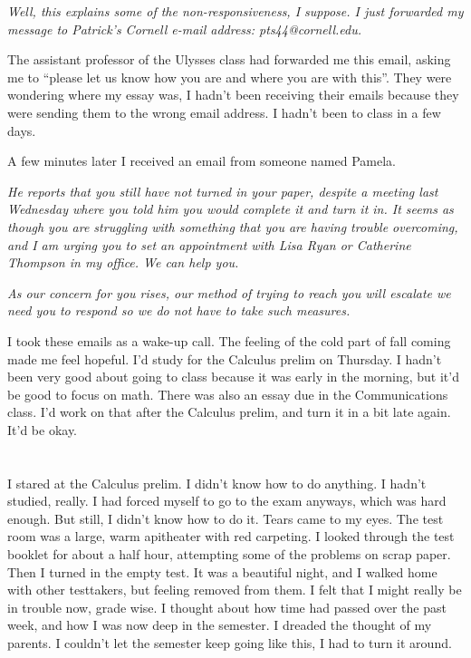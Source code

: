 \textit{Well, this explains some of the non-responsiveness, I suppose.  I just
forwarded my message to Patrick's Cornell e-mail address:  pts44@cornell.edu.}


The assistant professor of the Ulysses class had forwarded me this email, asking
me to ``please let us know how you are and where you are with this''.  They were
wondering where my essay was, I hadn't been receiving their emails because they
were sending them to the wrong email address.  I hadn't been to class in a few
days.

A few minutes later I received an email from someone named Pamela.

\textit{
He reports that you still have not turned in your paper, despite a meeting last
Wednesday where you told him you would complete it and turn it in.  It seems as
though you are struggling with something that you are having trouble
overcoming, and I am urging you to set an appointment with Lisa Ryan or
Catherine Thompson in my office.  We can help you. }

\textit{
As our concern for you rises, our method of trying to reach you will escalate 
we need you to respond so we do not have to take such measures.}



I took these emails as a wake-up call.  The feeling of the cold part of fall
coming made me feel hopeful.  I'd study for the Calculus prelim on Thursday.  I
hadn't been very good about going to class because it was early in the morning,
but it'd be good to focus on math.  There was also an essay due in the
Communications class.  I'd work on that after the Calculus prelim, and turn it
in a bit late again.  It'd be okay.

\section{}

I stared at the Calculus prelim.  I didn't know how to do anything.  I hadn't
studied, really. I had forced myself to go to the exam anyways, which was hard
enough.  But still, I didn't know how to do it.  Tears came to my eyes.  The
test room was a large, warm apitheater with red carpeting. I looked through the
test booklet for about a half hour, attempting some of the problems on scrap
paper.    Then I turned in the empty test.  It was a beautiful night, and I
walked home with other testtakers, but feeling removed from them.  I felt that I
might really be in trouble now, grade wise.  I thought about how time had passed
over the past week, and how I was now deep in the semester.  I dreaded the
thought of my parents.  I couldn't let the semester keep going like this, I had
to turn it around.

